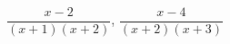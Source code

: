 \hspace*{2mm}\begin{minipage}[t]{\dimexpr\linewidth-2mm\relax}\vspace{0pt}
$\dfrac{x-2}{(x+1)(x+2)}$, $\dfrac{x-4}{(x+2)(x+3)}$\end{minipage}
